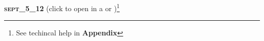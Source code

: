 \documentclass{article}
\begin{document}
\begin{adjustwidth}{-1cm}{}
{\noindent \large \bf \textsc{sept\_5\_12}} \hspace{0.2cm} (click to open in a \href{run:light\_summary.xls}{\color{blue} } or \href{run:light\_summary.txt}{\color{blue} })\footnote{See techincal help in {\bf Appendix}}
\end{adjustwidth}


\newpage
\null
\newpage

\end{document}
